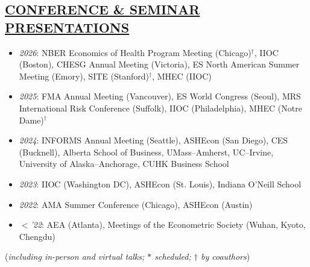 \documentclass{res}
\newcommand{\sectionbodyspace}{\vspace{1.5em}}
\newenvironment{cvitems}{%
  \begin{itemize}[leftmargin=15pt,labelindent=-15pt,itemindent=-15pt,itemsep=0.2em]
}{%
  \end{itemize}
}
\newcommand{\cvitem}[1]{\item[] #1}
\begin{document}
\begin{resume}
\section{\large{\ul{CONFERENCE \& SEMINAR PRESENTATIONS}}}
\sectionbodyspace
\begin{cvitems}
\cvitem{\textit{2026}: NBER Economics of Health Program Meeting (Chicago)$^{\dagger}$, IIOC (Boston), CHESG Annual Meeting (Victoria), ES North American Summer Meeting (Emory), SITE (Stanford)$^{\dagger}$}, MHEC (IIOC)
\cvitem{\textit{2025}: FMA Annual Meeting (Vancouver), ES World Congress (Seoul), MRS International Risk Conference (Suffolk), IIOC (Philadelphia), MHEC (Notre Dame)$^{\dagger}$}
\cvitem{\textit{2024}: INFORMS Annual Meeting (Seattle), ASHEcon (San Diego), CES (Bucknell), Alberta School of Business, UMass–Amherst, UC–Irvine, University of Alaska–Anchorage, CUHK Business School}
\cvitem{\textit{2023}: IIOC (Washington DC), ASHEcon (St. Louis), Indiana O'Neill School}
\cvitem{\textit{2022}: AMA Summer Conference (Chicago), ASHEcon (Austin)}
\cvitem{\textit{$<$'22}: AEA (Atlanta), Meetings of the Econometric Society (Wuhan, Kyoto, Chengdu)}
\end{cvitems}
\hfill {\small (\textit{including in-person and virtual talks; $*$ scheduled; $\dagger$ by coauthors})}

\end{resume}
\end{document}
